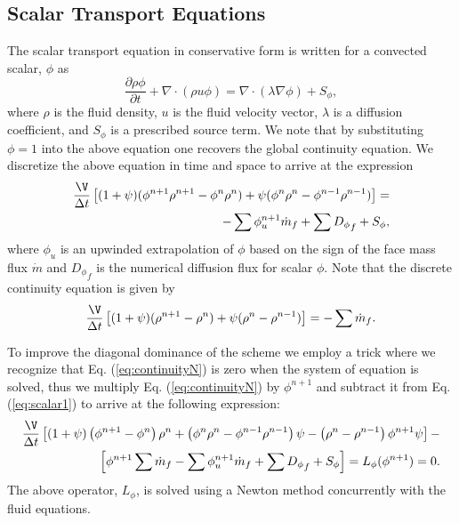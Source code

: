 \subsection{Scalar Transport Equations}

The scalar transport equation in conservative form is written for a
convected scalar, $\phi$ as
\begin{equation}
\frac{\partial \rho \phi}{\partial t} + \nabla \cdot (\rho u \phi) = \nabla\cdot(\lambda \nabla \phi) + S_\phi,
\end{equation}
where $\rho$ is the fluid density, $u$ is the fluid velocity vector,
$\lambda$ is a diffusion coefficient, and $S_\phi$ is a prescribed
source term.  We note that by substituting $\phi=1$ into the above
equation one recovers the global continuity equation.  We discretize
the above equation in time and space to arrive at the expression
\begin{eqnarray}
\frac{\V}{\Delta t} \left[ (1+\psi)(\phi^{n+1}\rho^{n+1}-\phi^n\rho^n) + \psi(\phi^n\rho^n-\phi^{n-1}\rho^{n-1})\right ] = \\\nonumber
 -\sum\phi^{n+1}_u\dot{m}_f + \sum{D_\phi}_f + S_\phi,
\label{eq:scalar1}
\end{eqnarray}
where $\phi_u$ is an upwinded extrapolation of $\phi$ based on the
sign of the face mass flux $\dot{m}$ and ${D_\phi}_f$ is the numerical
diffusion flux for scalar $\phi$.  Note that the discrete continuity equation is given by
\begin{equation}
\frac{\V}{\Delta t} \left[ (1+\psi)(\rho^{n+1}-\rho^n) + \psi(\rho^n-\rho^{n-1})\right ] = - \sum\dot{m}_f.
\label{eq:continuityN}
\end{equation}

To improve the diagonal dominance of the scheme we employ a trick
where we recognize that Eq. (\ref{eq:continuityN}) is zero when
the system of equation is solved, thus we multiply Eq.
(\ref{eq:continuityN}) by $\phi^{n+1}$ and subtract it from Eq.
(\ref{eq:scalar1}) to arrive at the following expression:
\begin{eqnarray}
\frac{\V}{\Delta t} \left[ \left(1+\psi\right)\left(\phi^{n+1}-\phi^n\right)\rho^n + \left(\phi^n\rho^n-\phi^{n-1}\rho^{n-1}\right)\psi-\left(\rho^n-\rho^{n-1}\right)\phi^{n+1}\psi\right ] - \\\nonumber
\left[\phi^{n+1}\sum\dot{m}_f-\sum\phi^{n+1}_u\dot{m}_f + \sum{D_\phi}_f + S_\phi\right] =L_\phi(\phi^{n+1}) = 0.
\label{eq:scalar2}
\end{eqnarray}
The above operator, $L_\phi$, is solved using a Newton method concurrently with the fluid equations.

